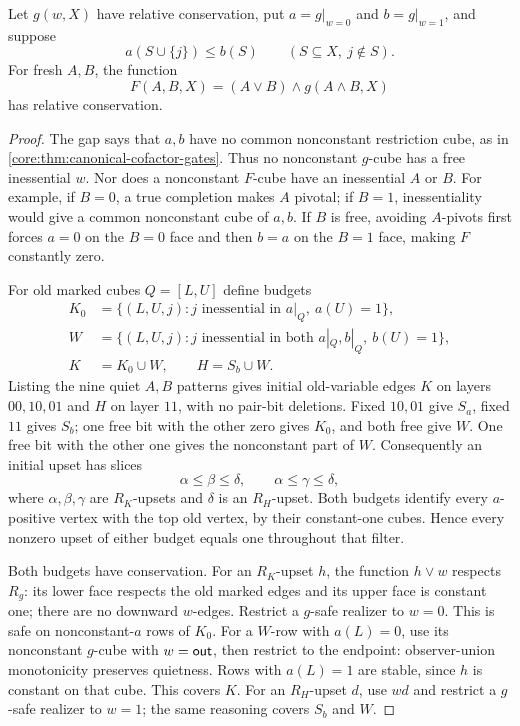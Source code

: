 \begin{theorem}
\label{core:thm:conservation-pair-gap}
Let $g(w,X)$ have relative conservation, put $a=g|_{w=0}$ and
$b=g|_{w=1}$, and suppose
\[
 a(S\cup\{j\})\leq b(S)\qquad(S\subseteq X,\ j\notin S).
\]
For fresh $A,B$, the function
\[
 F(A,B,X)=(A\vee B)\wedge g(A\wedge B,X)
\]
has relative conservation.
\end{theorem}
\begin{proof}
The gap says that $a,b$ have no common nonconstant restriction cube,
as in \cref{core:thm:canonical-cofactor-gates}. Thus no nonconstant
$g$-cube has a free inessential $w$. Nor does a nonconstant $F$-cube
have an inessential $A$ or $B$. For example, if $B=0$, a true completion
makes $A$ pivotal; if $B=1$, inessentiality would give a common
nonconstant cube of $a,b$. If $B$ is free, avoiding $A$-pivots first
forces $a=0$ on the $B=0$ face and then $b=a$ on the $B=1$ face,
making $F$ constantly zero.

For old marked cubes $Q=[L,U]$ define budgets
\[
\begin{aligned}
 K_0&=\{(L,U,j):j\text{ inessential in }a|_Q,\ a(U)=1\},\\
 W&=\{(L,U,j):j\text{ inessential in both }a|_Q,b|_Q,\ b(U)=1\},\\
 K&=K_0\cup W,\qquad H=S_b\cup W.
\end{aligned}
\]
Listing the nine quiet $A,B$ patterns gives initial old-variable edges
$K$ on layers $00,10,01$ and $H$ on layer $11$, with no pair-bit
deletions. Fixed $10,01$ give $S_a$, fixed $11$ gives $S_b$;
one free bit with the other zero gives $K_0$, and both free give $W$.
One free bit with the other one gives the nonconstant part of $W$.
Consequently an initial upset has slices
\[
 \alpha\leq\beta\leq\delta,\qquad \alpha\leq\gamma\leq\delta,
\]
where $\alpha,\beta,\gamma$ are $R_K$-upsets and $\delta$ is an
$R_H$-upset. Both budgets identify every $a$-positive vertex with the
top old vertex, by their constant-one cubes. Hence every nonzero
upset of either budget equals one throughout that filter.

Both budgets have conservation. For an $R_K$-upset $h$, the function
$h\vee w$ respects $R_g$: its lower face respects the old marked
edges and its upper face is constant one; there are no downward
$w$-edges. Restrict a $g$-safe realizer to $w=0$. This is safe on
nonconstant-$a$ rows of $K_0$. For a $W$-row with $a(L)=0$, use its
nonconstant $g$-cube with $w=\mathsf{out}$, then restrict to the endpoint:
observer-union monotonicity preserves quietness. Rows with $a(L)=1$
are stable, since $h$ is constant on that cube. This covers $K$.
For an $R_H$-upset $d$, use $wd$ and restrict a $g$-safe realizer to
$w=1$; the same reasoning covers $S_b$ and $W$.


\end{proof}
